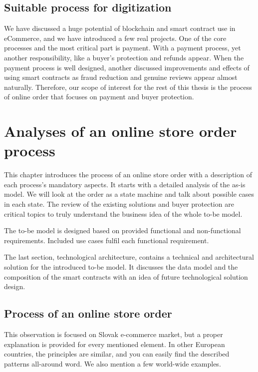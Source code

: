 \documentclass[thesis=M,english]{FITthesis}[2019/12/23]
\begin{document}
\section{Suitable process for digitization}

We have discussed a huge potential of blockchain and smart contract use in eCommerce, and we have introduced a few real projects. One of the core processes and the most critical part is payment. With a payment process, yet another responsibility, like a buyer's protection and refunds appear. When the payment process is well designed, another discussed improvements and effects of using smart contracts as fraud reduction and genuine reviews appear almost naturally. Therefore, our scope of interest for the rest of this thesis is the process of online order that focuses on payment and buyer protection.



\chapter{Analyses of an online store order process}

This chapter introduces the process of an online store order with a description of each process's mandatory aspects.  It starts with a detailed analysis of the as-is model. We will look at the order as a state machine and talk about possible cases in each state. The review of the existing solutions and buyer protection are critical topics to truly understand the business idea of the whole to-be model.

The to-be model is designed based on provided functional and non-functional requirements. Included use cases fulfil each functional requirement. 

The last section, technological architecture, contains a technical and architectural solution for the introduced to-be model. It discusses the data model and the composition of the smart contracts with an idea of future technological solution design.


\section{Process of an online store order} 

This observation is focused on Slovak e-commerce market, but a proper explanation is provided for every mentioned element. In other European countries, the principles are similar, and you can easily find the described patterns all-around word. We also mention a few world-wide examples.
\end{document}
